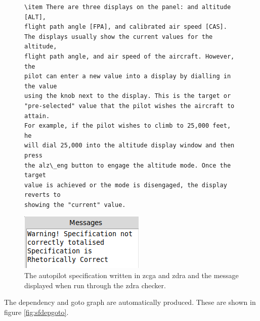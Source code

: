 \begin{figure}[H]
\begin{minipage}{0.45\textwidth}
\begin{tiny}
\begin{BVerbatim}[commandchars=+\[\]]
\item There are three displays on the panel: and altitude [ALT],
flight path angle [FPA], and calibrated air speed [CAS]. 
The displays usually show the current values for the altitude, 
flight path angle, and air speed of the aircraft. However, the 
pilot can enter a new value into a display by dialling in the value 
using the knob next to the display. This is the target or 
"pre-selected" value that the pilot wishes the aircraft to attain. 
For example, if the pilot wishes to climb to 25,000 feet, he 
will dial 25,000 into the altitude display window and then press 
the alz\_eng button to engage the altitude mode. Once the target 
value is achieved or the mode is disengaged, the display reverts to 
showing the "current" value.

 \end{BVerbatim}
 \end{tiny}
 \includegraphics[scale=0.5]{Figures/fullexample/sfzdramessage.png}
 \caption{The autopilot specification written in \gls{zcga} and \gls{zdra} and the message displayed when run through the \gls{zdra} checker.\label{fig:sfzdrazcgaout}}
 \end{minipage}
 \end{figure}

The dependency and goto
graph are automatically produced. These are shown in figure \ref{fig:sfdepgoto}.

